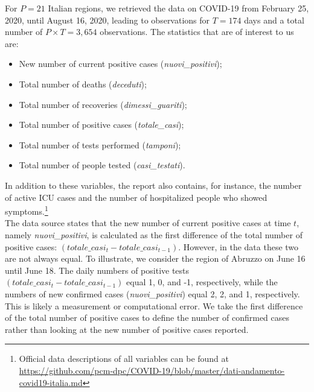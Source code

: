 \documentclass[12pt]{article}
\begin{document}
	For $P = 21$ Italian regions, we retrieved the data on COVID-19 from February 25, 2020, until August 16, 2020, leading to observations for $T = 174$ days and a total number of $P \times T = 3,654$ observations. The statistics that are of interest to us are:
	\begin{itemize}
	    \item New number of current positive cases (\textit{nuovi\_positivi});
	    \item Total number of deaths (\textit{deceduti});
	    \item Total number of recoveries (\textit{dimessi\_guariti});
	    \item Total number of positive cases (\textit{totale\_casi});
	    \item Total number of tests performed (\textit{tamponi});
	    \item Total number of people tested (\textit{casi\_testati}).
	\end{itemize}
	
	In addition to these variables, the report also contains, for instance, the number of active ICU cases and the number of hospitalized people who showed symptoms.\footnote{Official data descriptions of all variables can be found at \url{https://github.com/pcm-dpc/COVID-19/blob/master/dati-andamento-covid19-italia.md}} \\
	
	The data source states that the new number of current positive cases at time $t$, namely \textit{nuovi\_positivi}, is calculated as the first difference of the total number of positive cases: $(totale\_casi_t - totale\_casi_{t-1})$. However, in the data these two are not always equal. To illustrate, we consider the region of Abruzzo on June 16 until June 18. The daily numbers of positive tests $(totale\_casi_t - totale\_casi_{t-1})$ equal 1, 0, and -1, respectively, while the numbers of new confirmed cases (\textit{nuovi\_positivi}) equal 2, 2, and 1, respectively. This is likely a measurement or computational error. We take the first difference of the total number of positive cases to define the number of confirmed cases rather than looking at the new number of positive cases reported. \\
	
\end{document}
